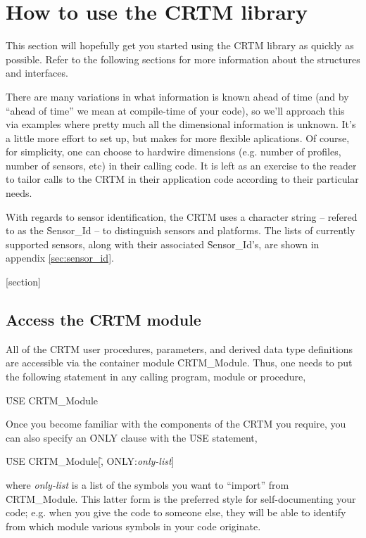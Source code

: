 \chapter{How to use the CRTM library}

This section will hopefully get you started using the CRTM library as quickly as possible. Refer to the following sections for more information about the structures and interfaces.

There are many variations in what information is known ahead of time (and by ``ahead of time'' we mean at compile-time of your code), so we'll approach this via examples where pretty much all the dimensional information is unknown. It's a little more effort to set up, but makes for more flexible aplications. Of course, for simplicity, one can choose to hardwire dimensions (e.g. number of profiles, number of sensors, etc) in their calling code. It is left as an exercise to the reader to tailor calls to the CRTM in their application code according to their particular needs.

With regards to sensor identification, the CRTM uses a character string -- refered to as the \f{Sensor\_Id} -- to distinguish sensors and platforms. The lists of currently supported sensors, along with their associated \f{Sensor\_Id}'s, are shown in appendix \ref{sec:sensor_id}.


[section]



\section{Access the CRTM module}
\label{sec:access_step}

All of the CRTM user procedures, parameters, and derived data type definitions are accessible via the container module \f{CRTM\_Module}. Thus, one needs to put the following statement in any calling program, module or procedure,

\qquad\f{USE CRTM\_Module}

Once you become familiar with the components of the CRTM you require, you can also specify an \f{ONLY} clause with the \f{USE} statement,

\qquad\f{USE CRTM\_Module}[\f{, ONLY:}\textit{only-list}]

where \textit{only-list} is a list of the symbols you want to ``import'' from \f{CRTM\_Module}. This latter form is the preferred style for self-documenting your code; e.g. when you give the code to someone else, they will be able to identify from which module various symbols in your code originate.



